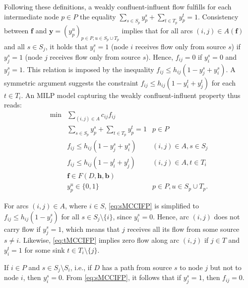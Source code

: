 \documentclass[pdflatex,sn-mathphys-num]{sn-jnl}%
\theoremstyle{thmstyleone}%
\begin{document}
Following these definitions, a weakly confluent-influent flow fulfills for each intermediate node $p\in P$ the equality $\sum_{s\in S_p}y_p^s+\sum_{t\in T_p}y_p^t=1$.
Consistency between $\boldsymbol{f}$ and $\boldsymbol{y}=\left(y_p^u\right)_{p\in P, u\in S_p\cup T_p}$ implies that for all arcs $(i,j)\in A(\boldsymbol{f})$ and all $s\in S_j$, it holds that $y_i^s=1$ (node $i$ receives flow only from source $s$) if $y_j^s=1$ (node $j$ receives flow only from source $s$). Hence, $f_{ij}=0$ if $y_i^s=0$ and $y_j^s=1$. This relation is imposed by the inequality $f_{ij}\leq h_{ij}\left(1-y_j^s+y_i^s\right)$.
A symmetric argument suggests the constraint $f_{ij}\leq h_{ij}\left(1-y_i^t+y_j^t\right)$ for each $t\in T_i$.
An MILP model capturing the weakly confluent-influent property thus reads:
\begin{eqnarray}
\min & \sum_{(i,j)\in A}c_{ij}f_{ij} \label{eq:objMCCIFP} \\
     & \sum_{s\in S_p}y_p^s+\sum_{t\in T_p}y_p^t = 1 & p\in P \label{eq:convMCCIFP} \\
     & f_{ij}\leq h_{ij}\left(1-y_j^s+y_i^s\right) & (i,j)\in A, s\in S_j \label{eq:sMCCIFP} \\
     & f_{ij}\leq h_{ij}\left(1-y_i^t+y_j^t\right) & (i,j)\in A, t\in T_i \label{eq:tMCCIFP} \\
     & \boldsymbol{f}\in F(D,\boldsymbol{h},\boldsymbol{b}) \label{eq:fMCCIFP} \\
     & y_p^u\in\{0,1\} & p\in P, u\in S_p\cup T_p \label{eq:xMCCIFP}.
\end{eqnarray}

For arcs $(i,j)\in A$, where $i\in S$, \eqref{eq:sMCCIFP} is simplified to $f_{ij}\leq h_{ij}(1-y_j^s)$ for all $s\in S_j\setminus\{i\}$, since $y_i^s=0$.
Hence, arc $(i,j)$ does not carry flow if $y_j^s=1$, which means that $j$ receives all its flow from some source $s\neq i$.
Likewise, \eqref{eq:tMCCIFP} implies zero flow along arc $(i,j)$ if $j\in T$ and $y_i^t=1$ for some sink $t\in T_i\setminus\{j\}$.

If $i\in P$ and $s\in S_j\setminus S_i$, i.e., if $D$ has a path from source $s$ to node $j$ but not to node $i$, then $y_i^s=0$.
From \eqref{eq:sMCCIFP}, it follows that if $y_j^s=1$, then $f_{ij}=0$.
\end{document}
